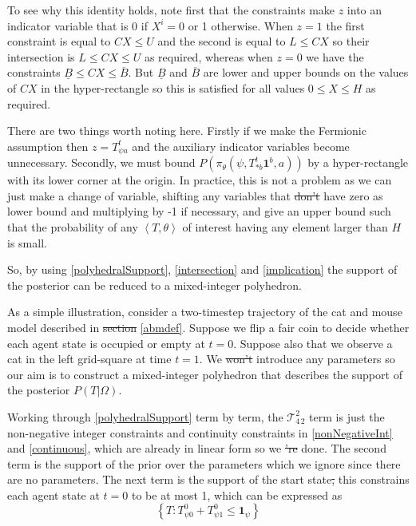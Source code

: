 \documentclass{article}
\providecommand{\DIFaddtex}[1]{{\protect\color{blue}\uwave{#1}}} %
\providecommand{\DIFdeltex}[1]{{\protect\color{red}\sout{#1}}}                      %
\providecommand{\DIFaddbegin}{} %
\providecommand{\DIFaddend}{} %
\providecommand{\DIFdelbegin}{} %
\providecommand{\DIFdelend}{} %
\providecommand{\DIFadd}[1]{\texorpdfstring{\DIFaddtex{#1}}{#1}} %
\providecommand{\DIFdel}[1]{\texorpdfstring{\DIFdeltex{#1}}{}} %
\newcommand{\DIFscaledelfig}{0.5}
\newlength{\DIFdelgraphicswidth} %
\newlength{\DIFdelgraphicsheight} %
\newcommand{\DIFaddincludegraphics}[2][]{{\color{blue}\fbox{\DIFOincludegraphics[#1]{#2}}}} %
\newcommand{\DIFdelincludegraphics}[2][]{%
\sbox{\DIFdelgraphicsbox}{\DIFOincludegraphics[#1]{#2}}%
\settoboxwidth{\DIFdelgraphicswidth}{\DIFdelgraphicsbox} %
\settoboxtotalheight{\DIFdelgraphicsheight}{\DIFdelgraphicsbox} %
\scalebox{\DIFscaledelfig}{%
\parbox[b]{\DIFdelgraphicswidth}{\usebox{\DIFdelgraphicsbox}\\[-\baselineskip] \rule{\DIFdelgraphicswidth}{0em}}\llap{\resizebox{\DIFdelgraphicswidth}{\DIFdelgraphicsheight}{%
\setlength{\unitlength}{\DIFdelgraphicswidth}%
\begin{picture}(1,1)%
\thicklines\linethickness{2pt} %
{\color[rgb]{1,0,0}\put(0,0){\framebox(1,1){}}}%
{\color[rgb]{1,0,0}\put(0,0){\line( 1,1){1}}}%
{\color[rgb]{1,0,0}\put(0,1){\line(1,-1){1}}}%
\end{picture}%
}\hspace*{3pt}}} %
} %
\DeclareRobustCommand{\DIFaddbegin}{\DIFOaddbegin \let\includegraphics\DIFaddincludegraphics} %
\DeclareRobustCommand{\DIFaddend}{\DIFOaddend \let\includegraphics\DIFOincludegraphics} %
\DeclareRobustCommand{\DIFdelbegin}{\DIFOdelbegin \let\includegraphics\DIFdelincludegraphics} %
\DeclareRobustCommand{\DIFdelend}{\DIFOaddend \let\includegraphics\DIFOincludegraphics} %
\begin{document}
To see why this identity holds, note first that the constraints make $z$ into an indicator variable that is 0 if $X^i=0$ or 1 otherwise. When $z=1$ the first constraint is equal to $CX \le U$ and the second is equal to $L \le CX$ so their intersection is $L \le  CX \le U$ as required, whereas when $z=0$ we have the constraints $\underline{B} \le CX \le \overline{B}$. But $\underline{B}$ and $\overline{B}$ are lower and upper bounds on the values of $CX$ in the hyper-rectangle so this is satisfied for all values $0 \le X \le H$ as required. 

There are two things worth noting here. Firstly if we make the Fermionic assumption then $z = T^t_{\psi a}$ and the auxiliary indicator variables become unnecessary. Secondly, we must bound $P(\pi_\theta(\psi,T^t_{*b}\mathbf{1}^b,a))$ by a hyper-rectangle with its lower corner at the origin. In practice, this is not a problem as we can just make a change of variable, shifting any variables that \DIFdelbegin \DIFdel{don't }\DIFdelend \DIFaddbegin \DIFadd{do not }\DIFaddend have zero as lower bound and multiplying by -1 if necessary, and give an upper bound such that the probability of any $\left<T,\theta\right>$ of interest having any element larger than $H$ is small.

So, by using \eqref{polyhedralSupport}, \eqref{intersection} and \eqref{implication} the support of the posterior can be reduced to a mixed-integer polyhedron.

As a simple illustration, consider a two-timestep trajectory of the cat and mouse model described in \DIFdelbegin \DIFdel{section }\DIFdelend \DIFaddbegin \DIFadd{Section~}\DIFaddend \ref{abmdef}. Suppose we flip a fair coin to decide whether each agent state is occupied or empty at $t=0$. Suppose also that we observe a cat in the left grid-square at time $t=1$. We \DIFdelbegin \DIFdel{won't }\DIFdelend \DIFaddbegin \DIFadd{will not }\DIFaddend introduce any parameters so our aim is to construct a mixed-integer polyhedron that describes the support of the posterior $P(T|\Omega)$.

Working through \eqref{polyhedralSupport} term by term, the $\mathcal{T}^2_{4\,2}$ term is just the non-negative integer constraints and continuity constraints in \eqref{nonNegativeInt} and \eqref{continuous}, which are already in linear form so we \DIFdelbegin \DIFdel{'re }\DIFdelend \DIFaddbegin \DIFadd{are }\DIFaddend done. The second term is the support of the prior over the parameters which we ignore since there are no parameters. The next term is the support of the start state\DIFdelbegin \DIFdel{, }\DIFdelend \DIFaddbegin \DIFadd{; }\DIFaddend this constrains each agent state at $t=0$ to be at most 1, which can be expressed as
\[
\left\{T:T^0_{\psi 0} + T^0_{\psi 1} \le \mathbf{1}_{\psi}\right\}
\]
\end{document}
